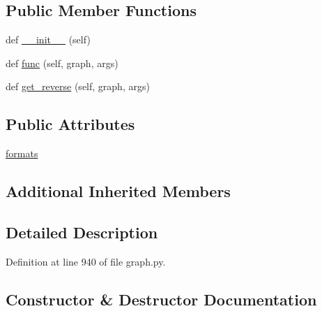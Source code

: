 \subsection*{Public Member Functions}
\begin{DoxyCompactItemize}
\item 
def \hyperlink{classlight__chats_1_1graph_1_1FollowFunction_a9945fa88f60ace0c4ff70bcedde1d92c}{\+\_\+\+\_\+init\+\_\+\+\_\+} (self)
\item 
def \hyperlink{classlight__chats_1_1graph_1_1FollowFunction_a6d1937938725b143930c10260adae130}{func} (self, graph, args)
\item 
def \hyperlink{classlight__chats_1_1graph_1_1FollowFunction_a1421ab114b2675c3a138e6b005036022}{get\+\_\+reverse} (self, graph, args)
\end{DoxyCompactItemize}
\subsection*{Public Attributes}
\begin{DoxyCompactItemize}
\item 
\hyperlink{classlight__chats_1_1graph_1_1FollowFunction_a3d3473d546a129f03d497102b10ea2a9}{formats}
\end{DoxyCompactItemize}
\subsection*{Additional Inherited Members}


\subsection{Detailed Description}
\begin{DoxyVerb}\end{DoxyVerb}
 

Definition at line 940 of file graph.\+py.



\subsection{Constructor \& Destructor Documentation}
\mbox{\label{classlight__chats_1_1graph_1_1FollowFunction_a9945fa88f60ace0c4ff70bcedde1d92c}} 

